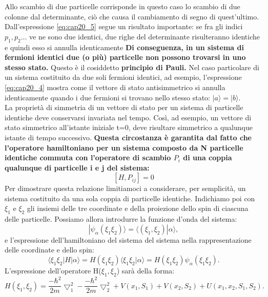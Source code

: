 \documentclass[a4paper,12pt,oneside]{book}
\begin{document}
Allo scambio di due particelle corrisponde in questo caso lo scambio di due colonne dal determinante, ciò che causa il cambiamento di segno di quest'ultimo.\\
Dall'espressione \ref{eq:cap20_5} segue un risultato importante: se fra gli indici $p_1, p_2...$ ve ne sono due identici, due righe del determinante risulteranno identiche e quindi esso si annulla identicamente \textbf{Di conseguenza, in un sistema di fermioni identici due (o pi\`u) particelle non possono trovarsi in uno stesso stato.} Questo è il cosiddetto \textbf{principio di Pauli.} Nel caso particolare di un sistema costituito da due soli fermioni identici, ad esempio, l'espressione \ref{eq:cap20_4} mostra come il vettore di stato antisimmetrico si annulla identicamente quando i due fermioni si trovano nello stesso stato: $|a\rangle= |b\rangle$.\\
La proprietà di simmetria di un vettore di stato per un sistema di particelle identiche deve conservarsi invariata nel tempo. Così, ad esempio, un vettore di stato simmetrico all'istante iniziale t=0, deve risultare simmetrico a qualunque istante di tempo successivo. \textbf{Questa circostanza è garantita dal fatto che l'operatore hamiltoniano per un sistema composto da N particelle identiche commuta con l'operatore di scambio $P_{i}$ di una coppia qualunque di particelle i e j del sistema:}\\
\begin{equation}
\left [ H, P_{ij}\right ]=0
\end{equation}
Per dimostrare questa relazione limitiamoci a considerare, per semplicit\`a, un sistema costituito da una sola coppia di particelle identiche. Indichiamo poi con $\xi_{1}$ e $\xi_{2}$ gli insiemi delle tre coordinate e della proiezione dello spin di ciascuna delle particelle. Possiamo allora introdurre la funzione d'onda del sistema:\\
\begin{equation}
|\psi_{\alpha}(\xi_1 \xi_2)\rangle =\langle(\xi_1, \xi_2)|\alpha\rangle ,
\end{equation}
e l'espressione dell'hamiltoniano del sistema del sistema nella rappresentazione delle coordinate e dello spin:
\begin{equation}
\langle \xi_1 \xi_2 |H|\alpha \rangle = H(\xi_1 \xi_2)\langle \xi_1 \xi_2 |\alpha \rangle =  H(\xi_1 \xi_2)\psi_{\alpha}(\xi_1 \xi_2) .
\end{equation}
L'espressione dell'operatore H($\xi_1, \xi_2$) sarà della forma:
\begin{equation}
H(\xi_1, \xi_2) = \frac{-\hbar^2}{2m}\bigtriangledown_1^2-\frac{-\hbar^2}{2m}\bigtriangledown_2^2+V(x_1, S_1)+V(x_2,S_2)+U(x_1,x_2,S_1,S_2) .
\end{equation}
\end{document}
